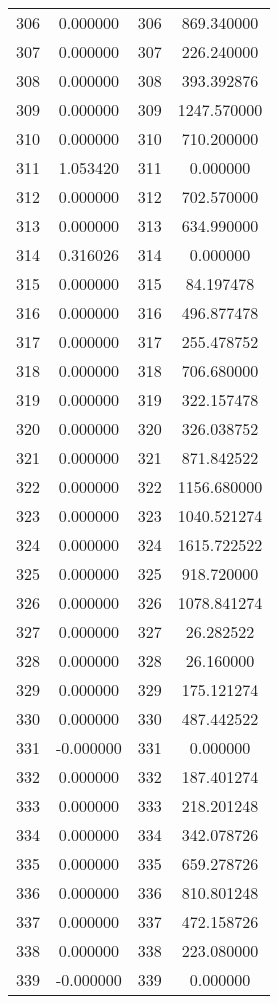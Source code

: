 \documentclass[12pt]{article}
\begin{document}
\begin{longtable}{@{}cccc@{}}
306 & 0.000000 & 306 & 869.340000 \\
307 & 0.000000 & 307 & 226.240000 \\
308 & 0.000000 & 308 & 393.392876 \\
309 & 0.000000 & 309 & 1247.570000 \\
310 & 0.000000 & 310 & 710.200000 \\
311 & 1.053420 & 311 & 0.000000 \\
312 & 0.000000 & 312 & 702.570000 \\
313 & 0.000000 & 313 & 634.990000 \\
314 & 0.316026 & 314 & 0.000000 \\
315 & 0.000000 & 315 & 84.197478 \\
316 & 0.000000 & 316 & 496.877478 \\
317 & 0.000000 & 317 & 255.478752 \\
318 & 0.000000 & 318 & 706.680000 \\
319 & 0.000000 & 319 & 322.157478 \\
320 & 0.000000 & 320 & 326.038752 \\
321 & 0.000000 & 321 & 871.842522 \\
322 & 0.000000 & 322 & 1156.680000 \\
323 & 0.000000 & 323 & 1040.521274 \\
324 & 0.000000 & 324 & 1615.722522 \\
325 & 0.000000 & 325 & 918.720000 \\
326 & 0.000000 & 326 & 1078.841274 \\
327 & 0.000000 & 327 & 26.282522 \\
328 & 0.000000 & 328 & 26.160000 \\
329 & 0.000000 & 329 & 175.121274 \\
330 & 0.000000 & 330 & 487.442522 \\
331 & -0.000000 & 331 & 0.000000 \\
332 & 0.000000 & 332 & 187.401274 \\
333 & 0.000000 & 333 & 218.201248 \\
334 & 0.000000 & 334 & 342.078726 \\
335 & 0.000000 & 335 & 659.278726 \\
336 & 0.000000 & 336 & 810.801248 \\
337 & 0.000000 & 337 & 472.158726 \\
338 & 0.000000 & 338 & 223.080000 \\
339 & -0.000000 & 339 & 0.000000 \\

\end{longtable}
\end{document}
